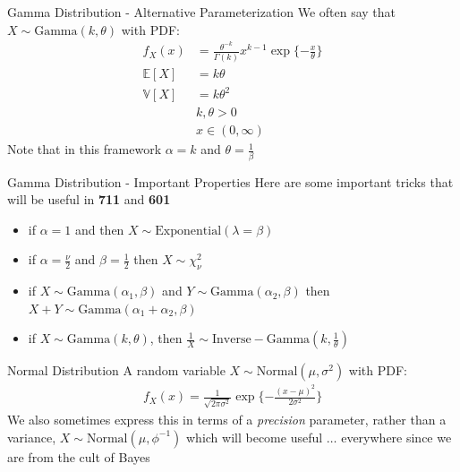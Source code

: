 \documentclass{beamer}
\begin{document}
\begin{frame}{Gamma Distribution - Alternative Parameterization}
We often say that $X\sim\mathrm{Gamma}(k, \theta)$ with PDF:
\begin{align*}
f_{X}(x) &= \frac{\theta^{-k}}{\Gamma(k)}x^{k-1}\exp\{-\frac{x}{\theta}\} \\
\mathbb{E}[X] &= k\theta \\
\mathbb{V}[X] &= k\theta^{2} \\
&k, \theta > 0 \\
&x \in (0, \infty)
\end{align*} 
Note that in this framework $\alpha = k$ and $\theta = \frac{1}{\beta}$
\end{frame}

\begin{frame}{Gamma Distribution  - Important Properties}
Here are some important tricks that will be useful in \textbf{711} and \textbf{601}
\begin{itemize}
\item{if $\alpha = 1$ and then $X\sim\mathrm{Exponential}(\lambda = \beta)$}
\item{if $\alpha = \frac{\nu}{2}$ and $\beta = \frac{1}{2}$ then $X\sim\chi^{2}_{\nu}$}
\item{if $X\sim\mathrm{Gamma}(\alpha_{1}, \beta)$ and $Y\sim\mathrm{Gamma}(\alpha_{2}, \beta)$ then $X+Y\sim\mathrm{Gamma}(\alpha_{1}+\alpha_{2}, \beta)$}
\item{if $X\sim\mathrm{Gamma}(k, \theta)$, then $\frac{1}{X}\sim\mathrm{Inverse-Gamma}(k, \frac{1}{\theta})$}
\end{itemize}
\end{frame}

\begin{frame}{Normal Distribution}
A random variable $X\sim\mathrm{Normal}(\mu, \sigma^{2})$ with PDF:
\begin{align*}
f_{X}(x) = \frac{1}{\sqrt{2\pi\sigma^{2}}}\exp\{-\frac{(x-\mu)^{2}}{2\sigma^{2}}\}
\end{align*}
We also sometimes express this in terms of a \emph{precision} parameter, rather than a variance, $X\sim\mathrm{Normal}(\mu, \phi^{-1})$ which will become useful $\ldots$ everywhere since we are from the cult of Bayes 
\end{frame}
\end{document}
